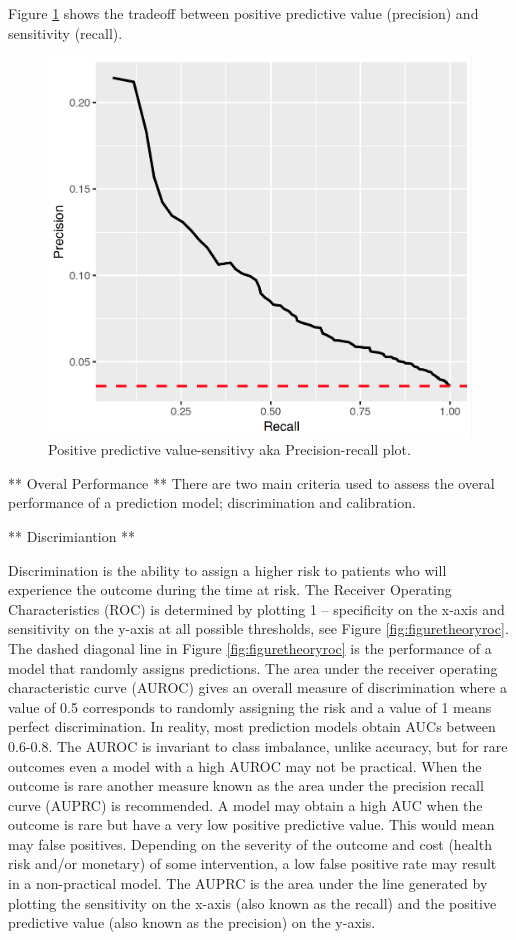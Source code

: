 \documentclass[11pt]{book}
\theoremstyle{definition}
\theoremstyle{definition}
\theoremstyle{definition}
\theoremstyle{remark}
\begin{document}
Figure \ref{fig:plpPrecisionRecall} shows the tradeoff between positive predictive value (precision) and sensitivity (recall).

\begin{figure}

{\centering \includegraphics[width=0.8\linewidth]{images/PatientLevelPrediction/precisionRecall} 

}

\caption{Positive predictive value-sensitivy aka Precision-recall plot.}\label{fig:plpPrecisionRecall}
\end{figure}

** Overal Performance **
There are two main criteria used to assess the overal performance of a prediction model; discrimination and calibration.

** Discrimiantion **

Discrimination is the ability to assign a higher risk to patients who will experience the outcome during the time at risk. The Receiver Operating Characteristics (ROC) is determined by plotting 1 -- specificity on the x-axis and sensitivity on the y-axis at all possible thresholds, see Figure \ref{fig:figuretheoryroc}. The dashed diagonal line in Figure \ref{fig:figuretheoryroc} is the performance of a model that randomly assigns predictions. The area under the receiver operating characteristic curve (AUROC) gives an overall measure of discrimination where a value of 0.5 corresponds to randomly assigning the risk and a value of 1 means perfect discrimination. In reality, most prediction models obtain AUCs between 0.6-0.8. The AUROC is invariant to class imbalance, unlike accuracy, but for rare outcomes even a model with a high AUROC may not be practical. When the outcome is rare another measure known as the area under the precision recall curve (AUPRC) is recommended. A model may obtain a high AUC when the outcome is rare but have a very low positive predictive value. This would mean may false positives. Depending on the severity of the outcome and cost (health risk and/or monetary) of some intervention, a low false positive rate may result in a non-practical model. The AUPRC is the area under the line generated by plotting the sensitivity on the x-axis (also known as the recall) and the positive predictive value (also known as the precision) on the y-axis.
\end{document}

